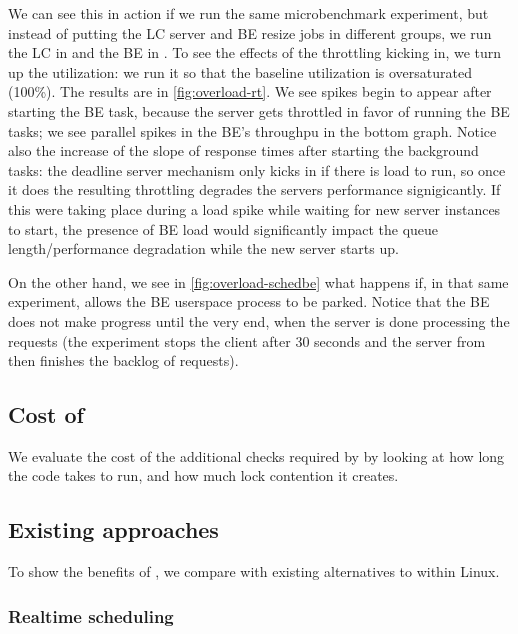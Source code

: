 We can see this in action if we run the same microbenchmark experiment, but
instead of putting the LC server and BE resize jobs in different groups, we run
the LC in \fifoclass{} and the BE in \normalclass{}. To see the effects of the
throttling kicking in, we turn up the utilization: we run it so that the
baseline utilization is oversaturated (100\%). The results are in
\autoref{fig:overload-rt}. We see spikes begin to appear after starting the BE
task, because the \fifoclass{} server gets throttled in favor of running the BE
tasks; we see parallel spikes in the BE's throughpu in the bottom graph. Notice
also the increase of the slope of response times after starting the background
tasks: the deadline server mechanism only kicks in if there is load to run, so
once it does the resulting throttling degrades the servers performance
signigicantly. If this were taking place during a load spike while waiting for
new server instances to start, the presence of BE load would significantly
impact the queue length/performance degradation while the new server starts
up.

On the other hand, we see in \autoref{fig:overload-schedbe} what happens
if, in that same experiment, \schedbe{} allows the BE userspace process to be
parked. Notice that the BE does not make progress until the very end, when the
server is done processing the requests (the experiment stops the client after 30
seconds and the server from then finishes the backlog of requests).



\subsection{Cost of \schedbe{}}

We evaluate the cost of the additional checks required by \schedbe{} by looking
at how long the code takes to run, and how much lock contention it
creates.




\subsection{Existing approaches}\label{ss:eval:existing}

To show the benefits of \schedbe{}, we compare with existing alternatives to
\cgroups{} within Linux.

\subsubsection{Realtime scheduling}

